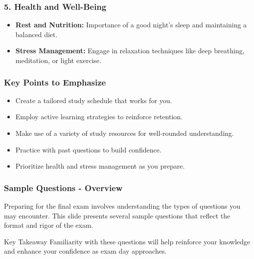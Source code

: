 \documentclass{beamer}
\begin{document}
\begin{frame}[fragile]
    \frametitle{5. Health and Well-Being}
    \begin{itemize}
        \item \textbf{Rest and Nutrition:} Importance of a good night’s sleep and maintaining a balanced diet.
        \item \textbf{Stress Management:} Engage in relaxation techniques like deep breathing, meditation, or light exercise.
    \end{itemize}
\end{frame}

\begin{frame}[fragile]
    \frametitle{Key Points to Emphasize}
    \begin{itemize}
        \item Create a tailored study schedule that works for you.
        \item Employ active learning strategies to reinforce retention.
        \item Make use of a variety of study resources for well-rounded understanding.
        \item Practice with past questions to build confidence.
        \item Prioritize health and stress management as you prepare.
    \end{itemize}
\end{frame}

\begin{frame}[fragile]
    \frametitle{Sample Questions - Overview}
    Preparing for the final exam involves understanding the types of questions you may encounter. This slide presents several sample questions that reflect the format and rigor of the exam. 
    \begin{block}{Key Takeaway}
        Familiarity with these questions will help reinforce your knowledge and enhance your confidence as exam day approaches.
    \end{block}
\end{frame}
\end{document}

